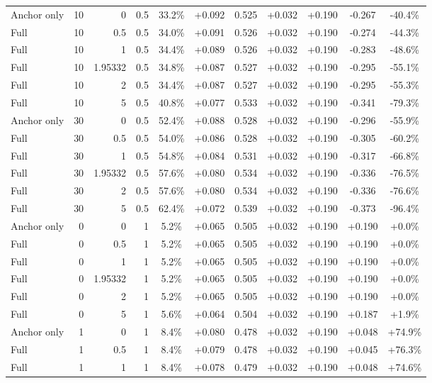 \begin{table}[htbp]
\begin{tabular}{lrrrccccccc}
Anchor only & 10 & 0 & 0.5 & 33.2\% & +0.092 & 0.525 & +0.032 & +0.190 & -0.267 & -40.4\% \\
Full & 10 & 0.5 & 0.5 & 34.0\% & +0.091 & 0.526 & +0.032 & +0.190 & -0.274 & -44.3\% \\
Full & 10 & 1 & 0.5 & 34.4\% & +0.089 & 0.526 & +0.032 & +0.190 & -0.283 & -48.6\% \\
Full & 10 & 1.95332 & 0.5 & 34.8\% & +0.087 & 0.527 & +0.032 & +0.190 & -0.295 & -55.1\% \\
Full & 10 & 2 & 0.5 & 34.4\% & +0.087 & 0.527 & +0.032 & +0.190 & -0.295 & -55.3\% \\
Full & 10 & 5 & 0.5 & 40.8\% & +0.077 & 0.533 & +0.032 & +0.190 & -0.341 & -79.3\% \\
Anchor only & 30 & 0 & 0.5 & 52.4\% & +0.088 & 0.528 & +0.032 & +0.190 & -0.296 & -55.9\% \\
Full & 30 & 0.5 & 0.5 & 54.0\% & +0.086 & 0.528 & +0.032 & +0.190 & -0.305 & -60.2\% \\
Full & 30 & 1 & 0.5 & 54.8\% & +0.084 & 0.531 & +0.032 & +0.190 & -0.317 & -66.8\% \\
Full & 30 & 1.95332 & 0.5 & 57.6\% & +0.080 & 0.534 & +0.032 & +0.190 & -0.336 & -76.5\% \\
Full & 30 & 2 & 0.5 & 57.6\% & +0.080 & 0.534 & +0.032 & +0.190 & -0.336 & -76.6\% \\
Full & 30 & 5 & 0.5 & 62.4\% & +0.072 & 0.539 & +0.032 & +0.190 & -0.373 & -96.4\% \\
Anchor only & 0 & 0 & 1 & 5.2\% & +0.065 & 0.505 & +0.032 & +0.190 & +0.190 & +0.0\% \\
Full & 0 & 0.5 & 1 & 5.2\% & +0.065 & 0.505 & +0.032 & +0.190 & +0.190 & +0.0\% \\
Full & 0 & 1 & 1 & 5.2\% & +0.065 & 0.505 & +0.032 & +0.190 & +0.190 & +0.0\% \\
Full & 0 & 1.95332 & 1 & 5.2\% & +0.065 & 0.505 & +0.032 & +0.190 & +0.190 & +0.0\% \\
Full & 0 & 2 & 1 & 5.2\% & +0.065 & 0.505 & +0.032 & +0.190 & +0.190 & +0.0\% \\
Full & 0 & 5 & 1 & 5.6\% & +0.064 & 0.504 & +0.032 & +0.190 & +0.187 & +1.9\% \\
Anchor only & 1 & 0 & 1 & 8.4\% & +0.080 & 0.478 & +0.032 & +0.190 & +0.048 & +74.9\% \\
Full & 1 & 0.5 & 1 & 8.4\% & +0.079 & 0.478 & +0.032 & +0.190 & +0.045 & +76.3\% \\
Full & 1 & 1 & 1 & 8.4\% & +0.078 & 0.479 & +0.032 & +0.190 & +0.048 & +74.6\% \\

\end{tabular}
\end{table}
